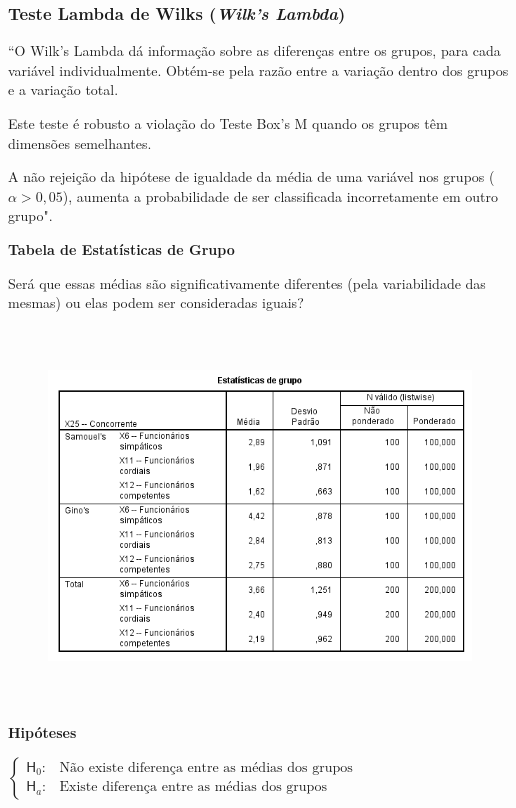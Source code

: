 		\subsubsection{Teste Lambda de Wilks (\textit{Wilk's Lambda})}

			``O Wilk’s Lambda dá informação sobre as diferenças entre os grupos, para cada variável individualmente. Obtém-se pela razão entre a variação dentro dos grupos e a variação total.

			Este teste é robusto a violação do Teste Box’s M quando os grupos têm dimensões semelhantes.

			A não rejeição da hipótese de igualdade da média de uma variável nos grupos ($\alpha > 0,05$), aumenta a probabilidade de ser classificada incorretamente em outro grupo".

			\bigskip

			\textbf{Tabela de Estatísticas de Grupo}

				Será que essas médias são significativamente diferentes (pela variabilidade das mesmas) ou elas podem ser consideradas iguais?

				\begin{figure}[H]
					\centering
					\includegraphics[height=10cm]{images/analise-discriminante_estatisticas-de-grupo}
				\end{figure}

			\textbf{Hipóteses}

				\bigskip

				$
					\begin{cases}

					\mathsf{H}_{0} : & \text{Não existe diferença entre as médias dos grupos} \\
					\mathsf{H}_{a} : & \text{Existe diferença entre as médias dos grupos}

					\end{cases}
				$

